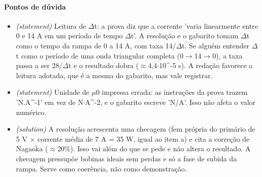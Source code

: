 \documentclass{article}%
\begin{document}
\paragraph{Pontos de dúvida}%
\begin{itemize}%
\item%
\textit{(statement)} Leitura de $\Delta$t: a prova diz que a corrente 'varia linearmente entre 0 e 14 A em um período de tempo $\Delta$t'. A resolução e o gabarito tomam $\Delta$t como o tempo da rampa de 0 a 14 A, com taxa 14/$\Delta$t. Se alguém entender $\Delta$t como o período de uma onda triangular completa (0$\to$14$\to$0), a taxa passa a ser 28/$\Delta$t e o resultado dobra ($\approx$4,4$\cdot$10\^{}{-}5 s). A redação favorece a leitura adotada, que é a mesma do gabarito, mas vale registrar.%
\item%
\textit{(statement)} Unidade de $\mu$0 impressa errada: as instruções da prova trazem 'N.A\^{}{-}1' em vez de N$\cdot$A\^{}{-}2, e o gabarito escreve 'N/A'. Isso não afeta o valor numérico.%
\item%
\textit{(solution)} A resolução acrescenta uma checagem (fem própria do primário de 5 V $\times$ corrente média de 7 A = 35 W, igual ao item a) e cita a correção de Nagaoka ($\approx$20\%). Isso vai além do que se pede e não altera o resultado. A checagem pressupõe bobinas ideais sem perdas e só a fase de subida da rampa. Serve como coerência, não como demonstração.%
\end{itemize}%
\end{document}
